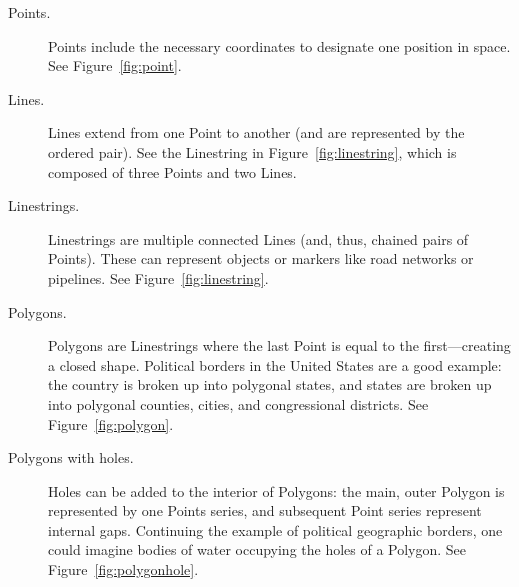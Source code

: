 \begin{description}
  \item[Points.] Points include the necessary coordinates to designate one position in space. See Figure~\ref{fig:point}.
  \item[Lines.] Lines extend from one Point to another (and are represented by the ordered pair). See the Linestring in Figure~\ref{fig:linestring}, which is composed of three Points and two Lines.
  \item[Linestrings.] Linestrings are multiple connected Lines (and, thus, chained pairs of Points). These can represent objects or markers like road networks or pipelines. See Figure~\ref{fig:linestring}.
  \item[Polygons.] Polygons are Linestrings where the last Point is equal to the first---creating a closed shape. Political borders in the United States are a good example: the country is broken up into polygonal states, and states are broken up into polygonal counties, cities, and congressional districts. See Figure~\ref{fig:polygon}.
  \item[Polygons with holes.] Holes can be added to the interior of Polygons: the main, outer Polygon is represented by one Points series, and subsequent Point series represent internal gaps. Continuing the example of political geographic borders, one could imagine bodies of water occupying the holes of a Polygon. See Figure~\ref{fig:polygonhole}.
\end{description}


